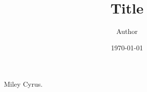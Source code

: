 \documentclass[a4paper, 12pt]{article}
\begin{document}
    \title{Title}
    \author{Author}
    \date{\today}

    Miley Cyrus.

    \clearpage
\end{document}
